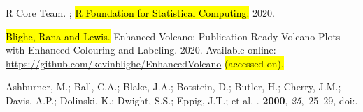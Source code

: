 \documentclass[ijms,article,accept,moreauthors,pdftex]{Definitions/mdpi}
\begin{document}
\begin{thebibliography}{999}
{R Core Team}.
;
\newblock \hl{R Foundation for Statistical Computing:} %
  2020.

\hl{Blighe, Rana and Lewis.} %
\newblock Enhanced Volcano: Publication-Ready Volcano Plots with Enhanced
  Colouring and Labeling.   2020.
\newblock Available online: \url{https://github.com/kevinblighe/EnhancedVolcano} \hl{(accessed on). } %

Ashburner, M.; Ball, C.A.; Blake, J.A.; Botstein, D.; Butler, H.; Cherry, J.M.;
  Davis, A.P.; Dolinski, K.; Dwight, S.S.; Eppig, J.T.; et al.
.
 {\bf 2000}, {\em 25},~25--29,
\newblock
  doi:{\href{https://doi.org/10.1038/75556}{}}.


\end{thebibliography}
\end{document}
